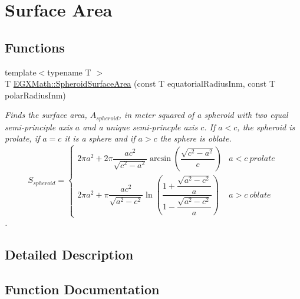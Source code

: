 \hypertarget{group___e_g_x_math-_geometry-3_d-_spheroid-_surface_area}{}\section{Surface Area}
\label{group___e_g_x_math-_geometry-3_d-_spheroid-_surface_area}
\subsection*{Functions}
\begin{DoxyCompactItemize}
\item 
{\footnotesize template$<$typename T $>$ }\\T \mbox{\hyperlink{group___e_g_x_math-_geometry-3_d-_spheroid-_surface_area_ga5a3580e7ded82cb678a558905f41ae49}{E\+G\+X\+Math\+::\+Spheroid\+Surface\+Area}} (const T equatorial\+Radius\+Inm, const T polar\+Radius\+Inm)
\begin{DoxyCompactList}\small\item\em Finds the surface area, $A_{spheroid}$, in meter squared of a spheroid with two equal semi-\/principle axis $a$ and a unique semi-\/princple axis $c$. If $a < c$, the spheroid is prolate, if $a = c$ it is a sphere and if $a>c$ the sphere is oblate. \[ S_{spheroid}=\begin{cases} 2\pi a^2 + 2\pi\dfrac{a c^2}{\sqrt{c^2-a^2}}\arcsin \left ( \dfrac{\sqrt{c^2-a^2}}{c} \right ) & a<c\ prolate \\ 2\pi a^2 +\pi \dfrac{a c^2}{\sqrt{a^2-c^2}}\ln \left(\dfrac{1+\dfrac{\sqrt{a^2-c^2}}{a}}{1-\dfrac{\sqrt{a^2-c^2}}{a}}\right )& a>c\ oblate \end{cases} \]. \end{DoxyCompactList}\end{DoxyCompactItemize}


\subsection{Detailed Description}


\subsection{Function Documentation}
\mbox{\label{group___e_g_x_math-_geometry-3_d-_spheroid-_surface_area_ga5a3580e7ded82cb678a558905f41ae49}} 

